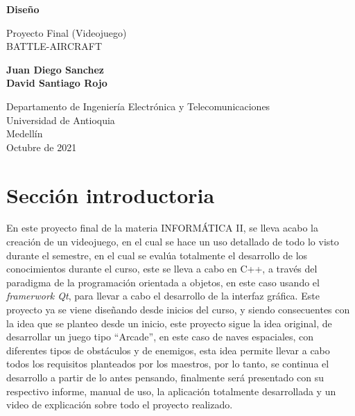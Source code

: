 \documentclass{article}
\begin{document}
\begin{titlepage}
    \begin{center}
        \vspace*{1cm}
            
        \Huge
        \textbf{Diseño}
            
        \vspace{0.5cm}
        \LARGE
        Proyecto Final (Videojuego)\\BATTLE-AIRCRAFT
            
        \vspace{1.5cm}
            
        \textbf{Juan Diego Sanchez\\David Santiago Rojo}
            
        \vfill
            
        \vspace{0.8cm}
            
        \Large
        Departamento de Ingeniería Electrónica y Telecomunicaciones\\
        Universidad de Antioquia\\
        Medellín\\
        Octubre de 2021
            
    \end{center}
\end{titlepage}

\tableofcontents
\newpage
\section{Sección introductoria}\label{intro}En este proyecto final de la materia INFORMÁTICA II, se lleva acabo la creación de un videojuego, en el cual se hace un uso detallado de todo lo visto durante el semestre, en el cual se evalúa totalmente el desarrollo de los conocimientos durante el curso, este se lleva a cabo en C++, a través del paradigma de la programación orientada a objetos, en este caso usando el \textit{framerwork Qt}, para llevar a cabo el desarrollo de la interfaz gráfica. Este proyecto ya se viene diseñando desde inicios del curso, y siendo consecuentes con la idea que se planteo desde un inicio, este proyecto sigue la idea original, de desarrollar un juego tipo “Arcade”, en este caso de naves espaciales, con diferentes tipos de obstáculos y de enemigos, esta idea permite llevar a cabo todos los requisitos planteados por los maestros, por lo tanto, se continua el desarrollo a partir de lo antes pensando, finalmente será presentado con su respectivo informe, manual de uso, la aplicación totalmente desarrollada y un video de explicación sobre todo el proyecto realizado.
\end{document}

